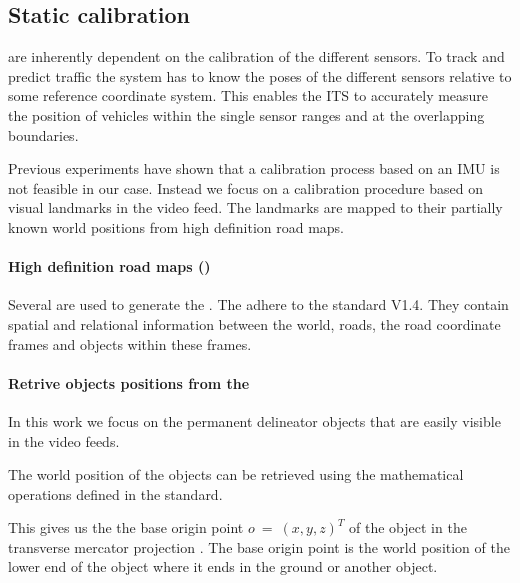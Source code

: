 
\subsection{Static calibration}


\ITS{} are inherently dependent on the calibration of the different sensors. 
To track and predict traffic the system has to know the poses of the different sensors relative to some reference coordinate system.
This enables the ITS to accurately measure the position of vehicles within the single sensor ranges and at the overlapping boundaries.

Previous experiments have shown that a calibration process based on an IMU is not feasible in our case. 
Instead we focus on a calibration procedure based on visual landmarks in the video feed.
The landmarks are mapped to their partially known world positions from high definition road maps. 

\paragraph{High definition road maps (\HDmaps{})}
Several \HDmaps{} are used to generate the \DigitalTwin{}.
The \HDmaps{} adhere to the \OD{} standard V1.4. 
They contain spatial and relational information between the world, roads, the road coordinate frames and objects within these frames.

\paragraph{Retrive objects positions from the \HDmaps}
In this work we focus on the permanent delineator objects that are easily visible in the video feeds.

The world position of the objects can be retrieved using the mathematical operations defined in the \OD{} standard.

This gives us the the base origin point $o~=~(x, y, z)^T$ of the object in the transverse mercator projection \cite{proj}. 
The base origin point is the world position of the lower end of the object where it ends in the ground or another object.

